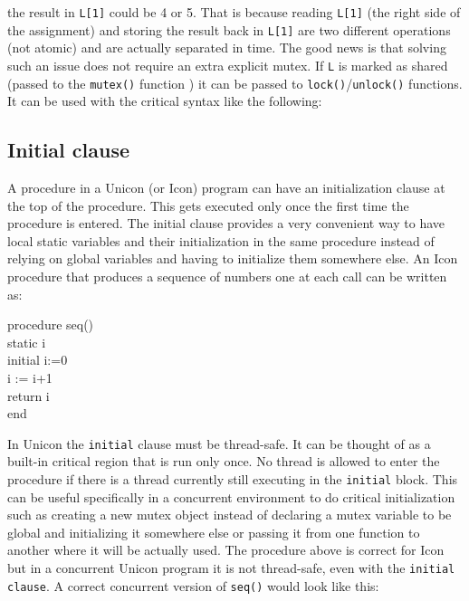 
\noindent
the result in \texttt{L[1]} could be 4 or 5. That is because reading
\texttt{L[1]} (the right side of the assignment) and storing the result
back in \texttt{L[1]} are two different operations (not atomic) and are
actually separated in time. The good news is that solving such an issue
does not require an extra explicit mutex.  If \texttt{L} is marked as
shared (passed to the \texttt{mutex()} function ) it can be passed to
\texttt{lock()}/\texttt{unlock()} functions.  It can be used with the
critical syntax like the following:


\subsection{Initial clause}
\label{Unicon-Initial-Clause}
A procedure in a Unicon (or Icon) program can have an initialization clause
at the top of the procedure.  This gets executed only once the first time
the procedure is entered.  The initial clause provides a very convenient
way to have local static variables and their initialization in the same
procedure instead of relying on global variables and having to initialize
them somewhere else.  An Icon procedure that produces a sequence of numbers one
at each call can be written as:

\begin{iconcode}
procedure seq()\\
\>static i\\
\>initial i:=0\\
\>i := i+1\\
\>return i\\
end\\
\end{iconcode}

In Unicon the \texttt{initial} clause must be thread-safe. It can be
thought of as a built-in critical region that is run only once. No thread
is allowed to enter the procedure if there is a thread currently still
executing in the \texttt{initial} block. This can be useful specifically in
a concurrent environment to do critical initialization such as creating a
new mutex object instead of declaring a mutex variable to be global and
initializing it somewhere else or passing it from one function to another
where it will be actually used. The procedure above is correct for Icon but
in a concurrent Unicon program it is not thread-safe, even with the
\texttt{initial clause}.  A correct concurrent version of \texttt{seq()}
would look like this:

